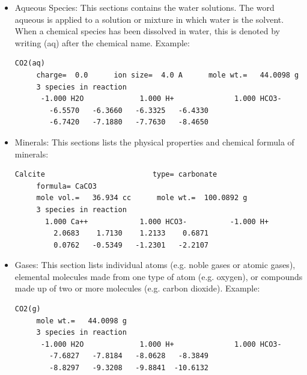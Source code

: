 \begin{enumerate}
\begin{itemize}
\item Aqueous Species: This sections contains the water solutions. The word aqueous is applied to a solution or mixture in which water is the solvent. When a chemical species has been dissolved in water, this is denoted by writing (aq) after the chemical name. Example:

\begin{minipage}[c]{0.92\textwidth}
\begin{lstlisting}[frame=single, caption=Excerpt of the section Aqueous Species]
CO2(aq)
     charge=  0.0      ion size=  4.0 A      mole wt.=   44.0098 g
     3 species in reaction
      -1.000 H2O             1.000 H+              1.000 HCO3-
        -6.5570   -6.3660   -6.3325   -6.4330
        -6.7420   -7.1880   -7.7630   -8.4650
\end{lstlisting}
\end{minipage}

\item Minerals: This sections lists the physical properties and chemical formula of minerals: 

\begin{minipage}[c]{0.92\textwidth}
\begin{lstlisting}[frame=single, caption=Excerpt of the section Minerals]
Calcite                         type= carbonate
     formula= CaCO3
     mole vol.=   36.934 cc      mole wt.=  100.0892 g
     3 species in reaction
       1.000 Ca++            1.000 HCO3-          -1.000 H+
         2.0683    1.7130    1.2133    0.6871
         0.0762   -0.5349   -1.2301   -2.2107
\end{lstlisting}
\end{minipage}

\item Gases: This section lists individual atoms (e.g. noble gases or atomic gases), elemental molecules made from one type of atom (e.g. oxygen), or compounds made up of two or more molecules (e.g. carbon dioxide). Example: 

\begin{minipage}[c]{0.92\textwidth}
\begin{lstlisting}[frame=single, caption=Excerpt of the section Gases]
CO2(g)
     mole wt.=   44.0098 g
     3 species in reaction
      -1.000 H2O             1.000 H+              1.000 HCO3-
        -7.6827   -7.8184   -8.0628   -8.3849
        -8.8297   -9.3208   -9.8841  -10.6132
\end{lstlisting}
\end{minipage}


\end{itemize}
\end{enumerate}
